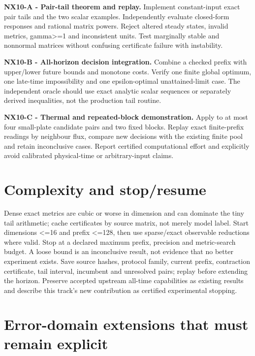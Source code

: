 \documentclass[
  11pt,
  a4paper,
]{report}
\begin{document}
\textbf{NX10-A - Pair-tail theorem and replay.} Implement constant-input
exact pair tails and the two scalar examples. Independently evaluate
closed-form responses and rational matrix powers. Reject altered steady
states, invalid metrics, gamma\textgreater=1 and inconsistent units.
Test marginally stable and nonnormal matrices without confusing
certificate failure with instability.

\textbf{NX10-B - All-horizon decision integration.} Combine a checked
prefix with upper/lower future bounds and monotone costs. Verify one
finite global optimum, one late-time impossibility and one
epsilon-optimal unattained-limit case. The independent oracle should use
exact analytic scalar sequences or separately derived inequalities, not
the production tail routine.

\textbf{NX10-C - Thermal and repeated-block demonstration.} Apply to at
most four small-plate candidate pairs and two fixed blocks. Replay exact
finite-prefix readings by neighbour flux, compare new decisions with the
existing finite pool and retain inconclusive cases. Report certified
computational effort and explicitly avoid calibrated physical-time or
arbitrary-input claims.

\hypertarget{complexity-and-stopresume}{%
\section{Complexity and stop/resume}\label{complexity-and-stopresume}}

Dense exact metrics are cubic or worse in dimension and can dominate the
tiny tail arithmetic; cache certificates by source matrix, not merely
model label. Start dimensions \textless=16 and prefix \textless=128,
then use sparse/exact observable reductions where valid. Stop at a
declared maximum prefix, precision and metric-search budget. A loose
bound is an inconclusive result, not evidence that no better experiment
exists. Save source hashes, protocol family, current prefix, contraction
certificate, tail interval, incumbent and unresolved pairs; replay
before extending the horizon. Preserve accepted upstream all-time
capabilities as existing results and describe this track's new
contribution as certified experimental stopping.

\hypertarget{error-domain-extensions-that-must-remain-explicit}{%
\section{Error-domain extensions that must remain
explicit}\label{error-domain-extensions-that-must-remain-explicit}}
\end{document}

